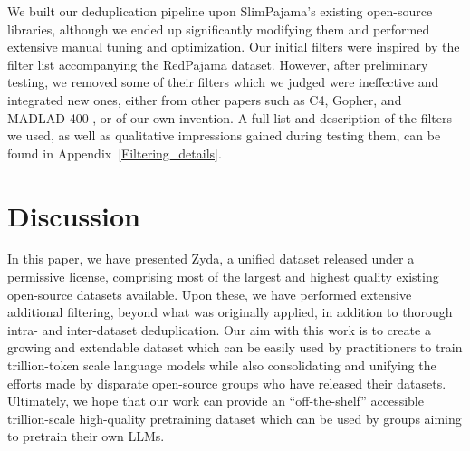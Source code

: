 \documentclass{article}
\begin{document}
We built our deduplication pipeline upon SlimPajama's existing open-source libraries, although we ended up significantly modifying them and performed extensive manual tuning and optimization. Our initial filters were inspired by the filter list accompanying the RedPajama dataset. However, after preliminary testing, we removed some of their filters which we judged were ineffective and integrated new ones, either from other papers such as C4, Gopher, and MADLAD-400 \citep{kudugunta2024madlad}, or of our own invention. A full list and description of the filters we used, as well as qualitative impressions gained during testing them, can be found in Appendix~\ref{Filtering_details}.






\section{Discussion}

In this paper, we have presented Zyda, a unified dataset released under a permissive license, comprising most of the largest and highest quality existing open-source datasets available. Upon these, we have performed extensive additional filtering, beyond what was originally applied, in addition to thorough intra- and inter-dataset deduplication. Our aim with this work is to create a growing and extendable dataset which can be easily used by practitioners to train trillion-token scale language models while also consolidating and unifying the efforts made by disparate open-source groups who have released their datasets. Ultimately, we hope that our work can provide an ``off-the-shelf'' accessible trillion-scale high-quality pretraining dataset which can be used by groups aiming to pretrain their own LLMs.
\end{document}
